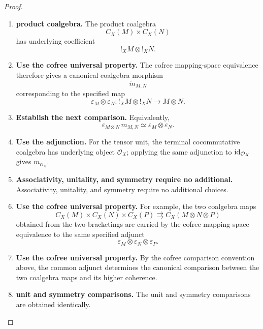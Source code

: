 \begin{proof}
\leavevmode
\begin{enumerate}[label=\textup{(\arabic*)}]
    \item \textbf{product coalgebra.}
    The product coalgebra
    \[
        C_X(M)\times C_X(N)
    \]
    has underlying coefficient
    \[
        !_XM\otimes !_XN.
    \]

    \item \textbf{Use the cofree universal property.}
    The cofree mapping-space equivalence therefore gives a canonical coalgebra morphism
    \[
        \widetilde m_{M,N}
    \]
    corresponding to the specified map
    \[
        \varepsilon_M\otimes\varepsilon_N:
        !_XM\otimes !_XN
        \longrightarrow
        M\otimes N.
    \]

    \item \textbf{Establish the next comparison.}
    Equivalently,
    \[
        \varepsilon_{M\otimes N}\,m_{M,N}
        \simeq
        \varepsilon_M\otimes\varepsilon_N.
    \]

    \item \textbf{Use the adjunction.}
    For the tensor unit, the terminal cocommutative coalgebra has underlying object \(\mathcal O_X\);
    applying the same adjunction to \(\operatorname{id}_{\mathcal O_X}\) gives \(m_{\mathcal O_X}\).

    \item \textbf{Associativity, unitality, and symmetry require no additional.}
    Associativity, unitality, and symmetry require no additional choices.

    \item \textbf{Use the cofree universal property.}
    For example, the two coalgebra maps
    \[
        C_X(M)\times C_X(N)\times C_X(P)
        \rightrightarrows
        C_X(M\otimes N\otimes P)
    \]
    obtained from the two bracketings are carried by the cofree mapping-space equivalence to the
    same specified adjunct
    \[
        \varepsilon_M\otimes\varepsilon_N\otimes\varepsilon_P.
    \]

    \item \textbf{Use the cofree universal property.}
    By the cofree comparison convention above, the common adjunct determines the canonical
    comparison between the two coalgebra maps and its higher coherence.

    \item \textbf{unit and symmetry comparisons.}
    The unit and symmetry comparisons are obtained identically.


\end{enumerate}
\end{proof}

